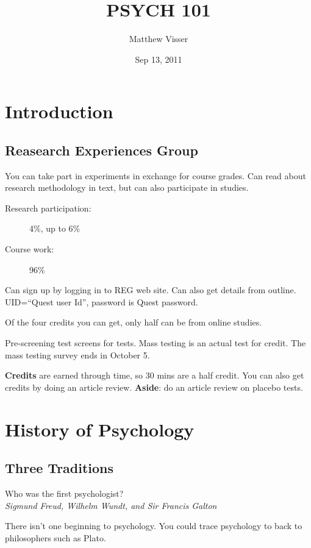 \documentclass[12pt]{article}
\begin{document}
\title{PSYCH 101}
\author{Matthew Visser}
\date{Sep 13, 2011}
\maketitle

\section*{Introduction}

\subsection*{Reasearch Experiences Group}

You can take part in experiments in exchange for course grades. Can read about
research methodology in text, but can also participate in studies.

\begin{description}
    \item[Research participation:] 4\%, up to 6\%
    \item[Course work:] 96\%
\end{description}

Can sign up by logging in to REG web site. Can also get details from outline.
UID=``Quest user Id'', password is Quest password.

Of the four credits you can get, only half can be from online studies.

Pre-screening test screens for tests. Mass testing is an actual test for credit.
The mass testing survey ends in October 5.

\textbf{Credits} are earned through time, so 30 mins are a half credit.
You can also get credits by doing an article review. \textbf{Aside}: do an
article review on placebo tests.

\section*{History of Psychology}
\subsection*{Three Traditions}

Who was the first psychologist?\\
\textit{Sigmund Freud, Wilhelm Wundt, and Sir Francis Galton}

There isn't one beginning to psychology. You could trace psychology to back to
philosophers such as Plato.
\end{document}

